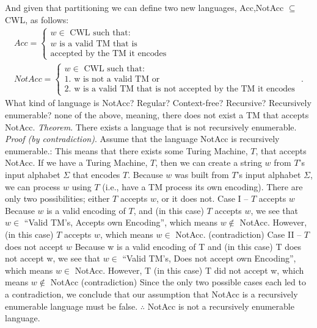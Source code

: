 \documentclass{report}
\begin{document}
\begin{itemize}
\begin{itemize}
            \end{itemize}
            \bigbreak \noindent 
            And given that partitioning we can define two new languages, Acc,NotAcc $\subseteq$ CWL, as follows:
            \begin{align*}
               Acc = 
               \begin{cases}
                   w \in \text{ CWL such that: } \\
                   w \text{ is a valid TM that is } \\
                   \text{accepted by the TM it encodes}
               \end{cases} \\
               NotAcc = 
               \begin{cases}
                   w \in \text{ CWL such that: } \\
                   \text{1. w is not a valid TM or} \\
                   \text{2. w is a valid TM that is not accepted by the TM it encodes }
               \end{cases}
            .\end{align*}
            What kind of language is NotAcc? Regular? Context-free? Recursive? Recursively enumerable? none of the above, meaning, there does not exist a TM that accepts NotAcc.
            \bigbreak \noindent 
            \textit{Theorem}. There exists a language that is not recursively enumerable.
\bigbreak \noindent 
\textit{Proof (by contradiction)}. Assume that the language NotAcc is recursively enumerable.:
\bigbreak \noindent 
{}
\bigbreak \noindent 
This means that there exists some Turing Machine, $T$, that accepts NotAcc.
\bigbreak \noindent If we have a Turing Machine, $T$, then we can create a string $w$ from $T$’s input alphabet $\Sigma$ that encodes $T$. Because $w$ was built from $T$’s input alphabet $\Sigma$, we can process $w$ using $T$ (i.e., have a TM process its own encoding).
\bigbreak \noindent There are only two possibilities; either $T$ accepts $w$, or it does not.
\bigbreak \noindent 
Case I – $T$ accepts $w$
\bigbreak \noindent 
Because $w$ is a valid encoding of $T$, and (in this case) $T$ accepts $w$, we see that $w \in$ “Valid TM’s, Accepts own Encoding”,
which means $w \not\in $ NotAcc. However, (in this case) $T$ accepts $w$, which means $w \in$ NotAcc. (contradiction)
\bigbreak \noindent 
Case II – $T$ does not accept $w$
\bigbreak \noindent 
Because w is a valid encoding of T and (in this case) T does not accept w, we see
that $w \in$ “Valid TM’s, Does not accept own Encoding”, which means $w \in$ NotAcc.
\bigbreak \noindent 
However, T (in this case) T did not accept w,
which means $w \not\in$ NotAcc (contradiction)
\bigbreak \noindent 
Since the only two possible cases each led to a contradiction, we
conclude that our assumption that NotAcc is a recursively
enumerable language must be false.
\bigbreak \noindent 
$\therefore$ NotAcc is not a recursively enumerable language.



    \end{itemize}
\end{document}
